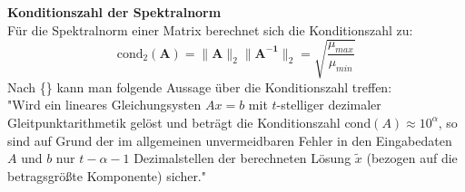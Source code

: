 {\textbf{Konditionszahl der Spektralnorm}\\
%
Für die Spektralnorm einer Matrix berechnet sich die Konditionszahl zu:
$$ 
\text{cond}_2(\mathbf{A}) = \lVert \mathbf{A} \rVert_2 \lVert \mathbf{A^{-1}} \rVert_2=
\sqrt{\frac{\mu_{max}}{\mu_{min}}}
$$
Nach \{\} kann man folgende Aussage über die Konditionszahl treffen:\\
"Wird ein lineares Gleichungsysten $Ax=b$ mit $t$-stelliger dezimaler Gleitpunktarithmetik gelöst und beträgt die Konditionszahl $\text{cond}(A) \approx10^\alpha$, so sind auf Grund der im allgemeinen unvermeidbaren Fehler in den Eingabedaten $A$ und $b$ nur $t-\alpha-1$ Dezimalstellen der berechneten Lösung $\tilde{x}$ (bezogen auf die betragsgrößte Komponente) sicher."
}
